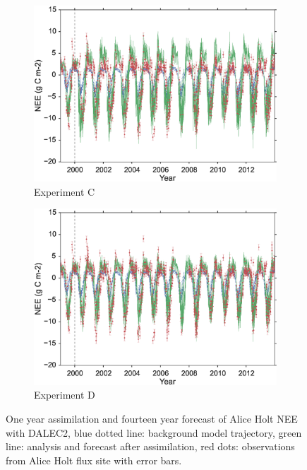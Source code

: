 \documentclass[11pt]{article}
\begin{document}
\begin{figure}
\begin{subfigure}[b]{0.49\textwidth}
        \includegraphics[width=\textwidth]{C4dvar.eps}
        \caption{Experiment C}
        \label{fig:4dvarBcorR}
    \end{subfigure}
    \begin{subfigure}[b]{0.49\textwidth}
        \includegraphics[width=\textwidth]{D4dvar.eps}
        \caption{Experiment D}
        \label{fig:4dvaredcBcorR}
    \end{subfigure}
    \caption{One year assimilation and fourteen year forecast of Alice Holt NEE with DALEC2, blue dotted line: background model trajectory, green line: analysis and forecast after assimilation, red dots: observations from Alice Holt flux site with error bars.}\label{fig:4dvar}
\end{figure}
\end{document}
